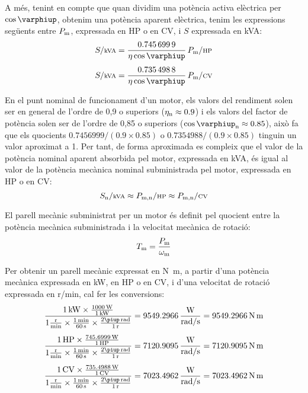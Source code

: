  A més, tenint en compte que quan dividim una potència activa elèctrica per $\cos\varphiup$, obtenim una potència aparent elèctrica, tenim les expressions següents entre $P_\mathrm{m}$, expressada en HP o en CV, i $S$ expressada en kVA:
\begin{align}
    S/{\scriptstyle\unit{kVA}} &= \frac{\num{0,7456999}}{\eta \cos\varphiup}\,   P\ped{m}/{\scriptstyle\unit{HP}} \\[1ex]
    S/{\scriptstyle\unit{kVA}} &= \frac{\num{0,7354988}}{\eta \cos\varphiup}\,   P\ped{m}/{\scriptstyle\unit{CV}}
\end{align}

En el punt nominal de funcionament d'un motor, els valors del rendiment solen ser en general de l'ordre de 0,9 o superiors ($\eta_\mathrm{n} \approx \num{0,9}$) i els valors del factor de potència solen ser de l'ordre de 0,85 o superiors ($\cos\varphiup\ped{n} \approx \num{0,85}$), això fa que els quocients $\num{0,7456999}/(\num{0,9} \times \num{0,85})$ o $\num{0,7354988}/(\num{0,9} \times \num{0,85})$ tinguin un valor aproximat a 1. Per tant, de forma aproximada es compleix que el valor de la potència nominal aparent absorbida pel motor, expressada en kVA, és igual al valor de la potència mecànica nominal subministrada pel motor, expressada en HP o en CV:
\begin{equation}\label{eq:kVA-CV-HP}
    S\ped{n}/{\scriptstyle \unit{kVA}} \approx  P\ped{m,n}/{\scriptstyle \unit{HP}} \approx  P\ped{m,n}/{\scriptstyle \unit{CV}}
\end{equation}


El parell mecànic subministrat per un motor és definit pel quocient entre la potència mecànica subministrada i la velocitat mecànica de rotació:
\begin{equation}\index{parell!mecànic}
    T\ped{m} = \frac{P\ped{m}}{\omega\ped{m}}\label{eq:T-P-w}
\end{equation}

Per  obtenir un  parell mecànic expressat en \unit{N.m}, a partir d'una potència mecànica expressada en kW, en HP o en CV, i d'una velocitat de rotació expressada en \unit{r/min}, cal  fer les conversions:
\begin{subequations}
\begin{align}
    \frac{\qty{1}{kW} \times \frac{\qty{1000}{W}}{\qty{1}{kW}}}{1\frac{\unit{r}}{\unit{min}} \times \frac{\qty{1}{min}}{\qty{60}{s}} \times \frac{2\piup\,\unit{rad}}{\qty{1}{r}}} &=  \num{9549,2966}\, \frac{\unit{W}}{\unit{rad/s}} = \qty{9549,2966}{N.m} \\[1ex]
    \frac{\qty{1}{HP} \times \frac{\qty{745,6999}{W}}{\qty{1}{HP}}}{1\frac{\unit{r}}{\unit{min}} \times \frac{\qty{1}{min}}{\qty{60}{s}} \times \frac{2\piup\,\unit{rad}}{\qty{1}{r}}} &=  \num{7120,9095}\, \frac{\unit{W}}{\unit{rad/s}} = \qty{7120,9095}{N.m} \\[1ex]
    \frac{\qty{1}{CV} \times \frac{\qty{735,4988}{W}}{\qty{1}{CV}}}{1\frac{\unit{r}}{\unit{min}} \times \frac{\qty{1}{min}}{\qty{60}{s}} \times \frac{2\piup\,\unit{rad}}{\qty{1}{r}}} &=  \num{7023,4962}\, \frac{\unit{W}}{\unit{rad/s}} = \qty{7023,4962}{N.m}
\end{align}
\end{subequations}

